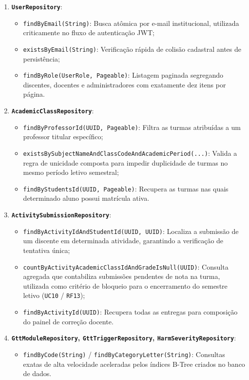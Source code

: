 \begin{enumerate}
    \item \textbf{\texttt{UserRepository}}:
    \begin{itemize}
        \item \texttt{findByEmail(String)}: Busca atômica por e-mail institucional, utilizada criticamente no fluxo de autenticação JWT;
        \item \texttt{existsByEmail(String)}: Verificação rápida de colisão cadastral antes de persistência;
        \item \texttt{findByRole(UserRole, Pageable)}: Listagem paginada segregando discentes, docentes e administradores com exatamente dez itens por página.
    \end{itemize}

    \item \textbf{\texttt{AcademicClassRepository}}:
    \begin{itemize}
        \item \texttt{findByProfessorId(UUID, Pageable)}: Filtra as turmas atribuídas a um professor titular específico;
        \item \texttt{existsBySubjectNameAndClassCodeAndAcademicPeriod(...)}: Valida a regra de unicidade composta para impedir duplicidade de turmas no mesmo período letivo semestral;
        \item \texttt{findByStudentsId(UUID, Pageable)}: Recupera as turmas nas quais determinado aluno possui matrícula ativa.
    \end{itemize}

    \item \textbf{\texttt{ActivitySubmissionRepository}}:
    \begin{itemize}
        \item \texttt{findByActivityIdAndStudentId(UUID, UUID)}: Localiza a submissão de um discente em determinada atividade, garantindo a verificação de tentativa única;
        \item \texttt{countByActivityAcademicClassIdAndGradeIsNull(}\linebreak \texttt{UUID)}: Consulta agregada que contabiliza submissões pendentes de nota na turma, utilizada como critério de bloqueio para o encerramento do semestre letivo (\texttt{UC10} / \texttt{RF13});
        \item \texttt{findByActivityId(UUID)}: Recupera todas as entregas para composição do painel de correção docente.
    \end{itemize}

    \item \textbf{\texttt{GttModuleRepository}, \texttt{GttTriggerRepository}, \texttt{HarmSeverityRepository}}:
    \begin{itemize}
        \item \texttt{findByCode(String)} / \texttt{findByCategoryLetter(String)}: Consultas exatas de alta velocidade aceleradas pelos índices B-Tree criados no banco de dados.
    \end{itemize}
\end{enumerate}

